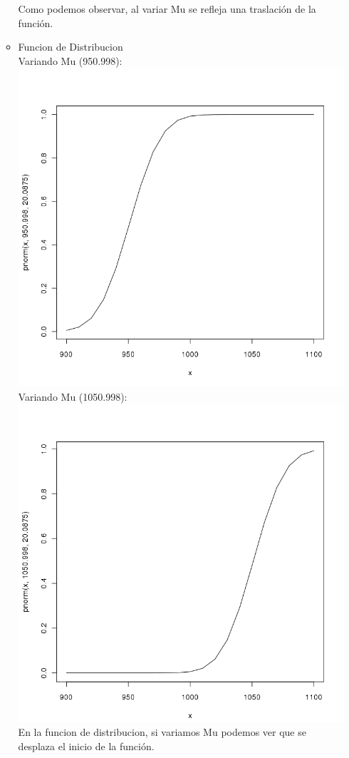 \begin{itemize}
\begin{itemize}
	Como podemos observar, al variar Mu se refleja una traslaci\'on de la funci\'on.\\
		\item Funcion de Distribucion\\
	        Variando Mu (950.998):\\
        \includegraphics[scale=0.5]{images/2_2-pnorm-variado1}\\
        Variando Mu (1050.998):\\
        \includegraphics[scale=0.5]{images/2_2-pnorm-variado2}\\
        En la funcion de distribucion, si variamos Mu podemos ver que se desplaza el inicio de la funci\'on.\\
			
	\end{itemize}
\end{itemize}
